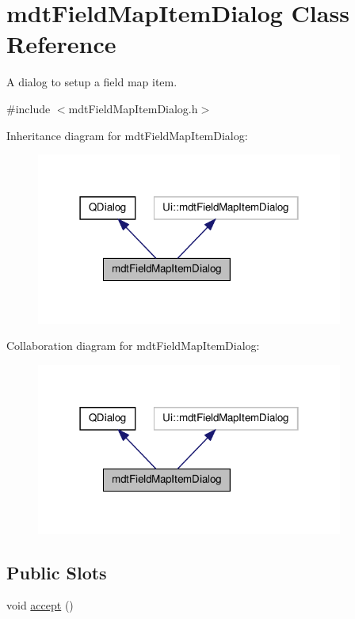 \hypertarget{classmdt_field_map_item_dialog}{\section{mdt\-Field\-Map\-Item\-Dialog Class Reference}
\label{classmdt_field_map_item_dialog}
}


A dialog to setup a field map item.  




{\ttfamily \#include $<$mdt\-Field\-Map\-Item\-Dialog.\-h$>$}



Inheritance diagram for mdt\-Field\-Map\-Item\-Dialog\-:
\nopagebreak
\begin{figure}[H]
\begin{center}
\leavevmode
\includegraphics[width=286pt]{classmdt_field_map_item_dialog__inherit__graph}
\end{center}
\end{figure}


Collaboration diagram for mdt\-Field\-Map\-Item\-Dialog\-:
\nopagebreak
\begin{figure}[H]
\begin{center}
\leavevmode
\includegraphics[width=286pt]{classmdt_field_map_item_dialog__coll__graph}
\end{center}
\end{figure}
\subsection*{Public Slots}
\begin{DoxyCompactItemize}
\item 
void \hyperlink{classmdt_field_map_item_dialog_a43b775a21d170f8d801f7c493cfdcdcc}{accept} ()
\end{DoxyCompactItemize}
